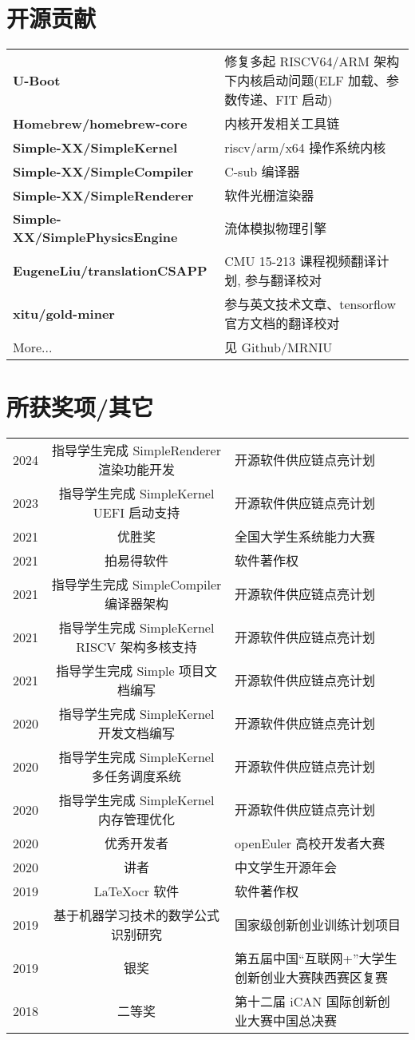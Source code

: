 \documentclass{resume}
\begin{document}
\section{开源贡献}
\begin{tabular}{ll}
  \textbf{U-Boot} & 修复多起 RISCV64/ARM 架构下内核启动问题(ELF 加载、参数传递、FIT 启动)\\
  \textbf{Homebrew/homebrew-core} & 内核开发相关工具链 \\
  \textbf{Simple-XX/SimpleKernel} & riscv/arm/x64 操作系统内核 \\
  \textbf{Simple-XX/SimpleCompiler} & C-sub 编译器 \\
  \textbf{Simple-XX/SimpleRenderer} & 软件光栅渲染器 \\
  \textbf{Simple-XX/SimplePhysicsEngine} & 流体模拟物理引擎 \\
  \textbf{EugeneLiu/translationCSAPP} & CMU 15-213 课程视频翻译计划, 参与翻译校对 \\
  \textbf{xitu/gold-miner} & 参与英文技术文章、tensorflow 官方文档的翻译校对 \\
  More... & 见 Github/MRNIU
\end{tabular}
\sectionsep

\section{所获奖项/其它} 
\begin{tabular}{rcl}
    2024         & 指导学生完成 SimpleRenderer 渲染功能开发 & 开源软件供应链点亮计划 \\
    2023         & 指导学生完成 SimpleKernel UEFI 启动支持 & 开源软件供应链点亮计划 \\
    2021         & 优胜奖 & 全国大学生系统能力大赛 \\ 
    2021         & 拍易得软件 & 软件著作权 \\
    2021         & 指导学生完成 SimpleCompiler 编译器架构 & 开源软件供应链点亮计划 \\
    2021         & 指导学生完成 SimpleKernel RISCV 架构多核支持 & 开源软件供应链点亮计划 \\
    2021         & 指导学生完成 Simple 项目文档编写 & 开源软件供应链点亮计划 \\
    2020         & 指导学生完成 SimpleKernel 开发文档编写 & 开源软件供应链点亮计划 \\
    2020         & 指导学生完成 SimpleKernel 多任务调度系统 & 开源软件供应链点亮计划 \\
    2020         & 指导学生完成 SimpleKernel 内存管理优化 & 开源软件供应链点亮计划 \\
    2020         & 优秀开发者 & openEuler 高校开发者大赛 \\ 
    2020         & 讲者 & 中文学生开源年会 \\
    2019         & LaTeXocr 软件 & 软件著作权 \\
    2019         & 基于机器学习技术的数学公式识别研究 & 国家级创新创业训练计划项目 \\
    2019         & 银奖    & 第五届中国“互联网+”大学生创新创业大赛陕西赛区复赛 \\
    2018         & 二等奖  & 第十二届 iCAN 国际创新创业大赛中国总决赛 \\
\end{tabular}
\sectionsep
\end{document}
